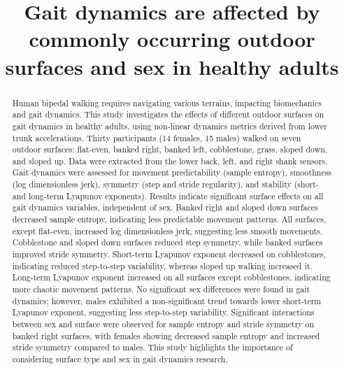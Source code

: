 \documentclass[authoryear,preprint,review,12pt]{elsarticle}
\begin{document}
\begin{frontmatter}

\title{Gait dynamics are affected by commonly occurring outdoor surfaces and sex in healthy adults}






\begin{abstract}
Human bipedal walking requires navigating various terrains, impacting biomechanics and gait dynamics. This study investigates the effects of different outdoor surfaces on gait dynamics in healthy adults, using non-linear dynamics metrics derived from lower trunk accelerations. Thirty participants (14 females, 15 males) walked on seven outdoor surfaces: flat-even, banked right, banked left, cobblestone, grass, sloped down, and sloped up. Data were extracted from the lower back, left, and right shank sensors. Gait dynamics were assessed for movement predictability (sample entropy), smoothness (log dimensionless jerk), symmetry (step and stride regularity), and stability (short- and long-term Lyapunov exponents). Results indicate significant surface effects on all gait dynamics variables, independent of sex. Banked right and sloped down surfaces decreased sample entropy, indicating less predictable movement patterns. All surfaces, except flat-even, increased log dimensionless jerk, suggesting less smooth movements. Cobblestone and sloped down surfaces reduced step symmetry, while banked surfaces improved stride symmetry. Short-term Lyapunov exponent decreased on cobblestones, indicating reduced step-to-step variability, whereas sloped up walking increased it. Long-term Lyapunov exponent increased on all surfaces except cobblestones, indicating more chaotic movement patterns. No significant sex differences were found in gait dynamics; however, males exhibited a non-significant trend towards lower short-term Lyapunov exponent, suggesting less step-to-step variability. Significant interactions between sex and surface were observed for sample entropy and stride symmetry on banked right surfaces, with females showing decreased sample entropy and increased stride symmetry compared to males. This study highlights the importance of considering surface type and sex in gait dynamics research. 
\end{abstract}



\end{frontmatter}
\end{document}
